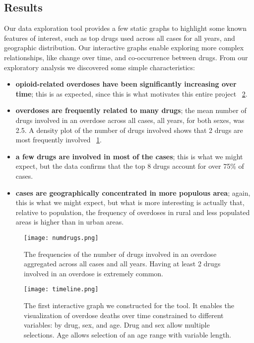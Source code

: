 \documentclass{article}
\begin{document}
\subsection{Results}

Our data exploration tool provides a few static graphs to highlight some known features of interest, such as top drugs used across all cases for all years, and geographic distribution. Our interactive graphs enable exploring more complex relationships, like change over time, and co-occurrence between drugs. From our exploratory analysis we discovered some simple characteristics:
\begin{itemize}
\item {\bf opioid-related overdoses have been significantly increasing over time}; this is as expected, since this is what motivates this entire project ~\ref{fig:timeline}.
\item {\bf overdoses are frequently related to many drugs}; the mean number of drugs involved in an overdose across all cases, all years, for both sexes, was 2.5. A density plot of the number of drugs involved shows that 2 drugs are most frequently involved ~\ref{fig:numdrugs}.
\item {\bf a few drugs are involved in most of the cases}; this is what we might expect, but the data confirms that the top 8 drugs account for over 75\% of cases.
\item {\bf cases are geographically concentrated in more populous area}; again, this is what we might expect, but what is more interesting is actually that, relative to population, the frequency of overdoses in rural and less populated areas is higher than in urban areas.
\end{itemize}

\begin{figure}[h]
\centering
\texttt{[image: numdrugs.png]}
\caption{The frequencies of the number of drugs involved in an overdose aggregated across all cases and all years. Having at least 2 drugs involved in an overdose is extremely common.}
\label{fig:numdrugs}
\end{figure}

\begin{figure}[h]
\centering
\texttt{[image: timeline.png]}
\caption{The first interactive graph we constructed for the tool. It enables the visualization of overdose deaths over time constrained to different variables: by drug, sex, and age. Drug and sex allow multiple selections. Age allows selection of an age range with variable length.}
\label{fig:timeline}
\end{figure}
\end{document}
